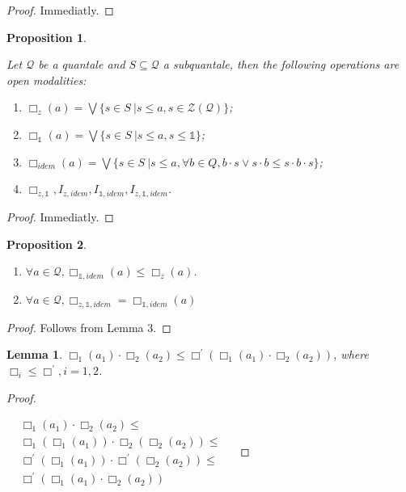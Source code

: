 \documentclass[a4paper]{article}
\theoremstyle{defin}
\theoremstyle{theorem}
\theoremstyle{prop}
\newtheorem{prop}{Proposition}
\theoremstyle{lemma}
\newtheorem{lemma}{Lemma}
\theoremstyle{ex}
\theoremstyle{col}
\begin{document}
\begin{proof}

Immediatly.
\end{proof}

\begin{prop}
$ $

Let $\mathcal{Q}$ be a quantale and $S \subseteq \mathcal{Q}$ a subquantale, then the following operations are open modalities:

\begin{enumerate}
  \item $\Box_z (a) = \bigvee \{ s \in S \: | s \leq a, s \in \mathcal{Z}(\mathcal{Q}) \}$;
  \item $\Box_{\mathds{1}} (a) = \bigvee \{ s \in S \: | s \leq a, s \leq \mathds{1} \}$;
  \item $\Box_{idem} (a) = \bigvee \{ s \in S \: | s \leq a, \forall b \in Q, b \cdot s \vee s \cdot b \leq s \cdot b \cdot s\}$;
  \item $\Box_{z, \mathds{1}}, I_{z, idem}, I_{\mathds{1}, idem}, I_{z, \mathds{1}, idem}$.
\end{enumerate}
\end{prop}

\begin{proof}
  Immediatly.
\end{proof}

\begin{prop}
$ $

\begin{enumerate}
  \item $\forall a \in \mathcal{Q}, \Box_{\mathds{1}, idem}(a) \leq \Box_z (a)$.
  \item $\forall a \in \mathcal{Q}, \Box_{z, \mathds{1}, idem} = \Box_{\mathds{1}, idem}(a)$
\end{enumerate}

\end{prop}

\begin{proof}
  Follows from Lemma 3.
\end{proof}

\begin{lemma}
  $\Box_1(a_1) \cdot \Box_2(a_2) \leq \Box^{'} (\Box_1(a_1) \cdot \Box_2(a_2))$, where $\Box_i \leq \Box^{'}, i = 1,2$.
\end{lemma}

\begin{proof}
$ $

  $\begin{array}{lll}
  &\Box_1(a_1) \cdot \Box_2(a_2) \leq & \\
  &\Box_1 (\Box_1 (a_1)) \cdot \Box_2 (\Box_2 (a_2)) \leq & \\
  &\Box^{'} (\Box_1 (a_1)) \cdot \Box^{'} (\Box_2 (a_2)) \leq & \\
  &\Box^{'}(\Box_1 (a_1) \cdot \Box_2 (a_2))&
  \end{array}$
\end{proof}
\end{document}
